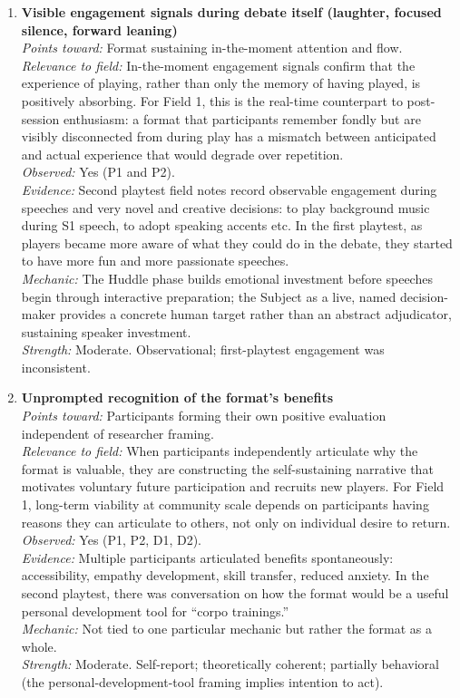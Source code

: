 \begin{enumerate}
\item \textbf{Visible engagement signals during debate itself (laughter, focused silence, forward leaning)}\\
\textit{Points toward:} Format sustaining in-the-moment attention and flow.\\
\textit{Relevance to field:} In-the-moment engagement signals confirm that the experience of playing, rather than only the memory of having played, is positively absorbing. For Field 1, this is the real-time counterpart to post-session enthusiasm: a format that participants remember fondly but are visibly disconnected from during play has a mismatch between anticipated and actual experience that would degrade over repetition.\\
\textit{Observed:} Yes (P1 and P2).\\
\textit{Evidence:} Second playtest field notes record observable engagement during speeches and very novel and creative decisions: to play background music during S1 speech, to adopt speaking accents etc. In the first playtest, as players became more aware of what they could do in the debate, they started to have more fun and more passionate speeches.\\
\textit{Mechanic:} The Huddle phase builds emotional investment before speeches begin through interactive preparation; the Subject as a live, named decision-maker provides a concrete human target rather than an abstract adjudicator, sustaining speaker investment.\\
\textit{Strength:} Moderate. Observational; first-playtest engagement was inconsistent.

\item \textbf{Unprompted recognition of the format's benefits}\\
\textit{Points toward:} Participants forming their own positive evaluation independent of researcher framing.\\
\textit{Relevance to field:} When participants independently articulate why the format is valuable, they are constructing the self-sustaining narrative that motivates voluntary future participation and recruits new players. For Field 1, long-term viability at community scale depends on participants having reasons they can articulate to others, not only on individual desire to return.\\
\textit{Observed:} Yes (P1, P2, D1, D2).\\
\textit{Evidence:} Multiple participants articulated benefits spontaneously: accessibility, empathy development, skill transfer, reduced anxiety. In the second playtest, there was conversation on how the format would be a useful personal development tool for ``corpo trainings.''\\
\textit{Mechanic:} Not tied to one particular mechanic but rather the format as a whole.\\
\textit{Strength:} Moderate. Self-report; theoretically coherent; partially behavioral (the personal-development-tool framing implies intention to act).


\end{enumerate}
